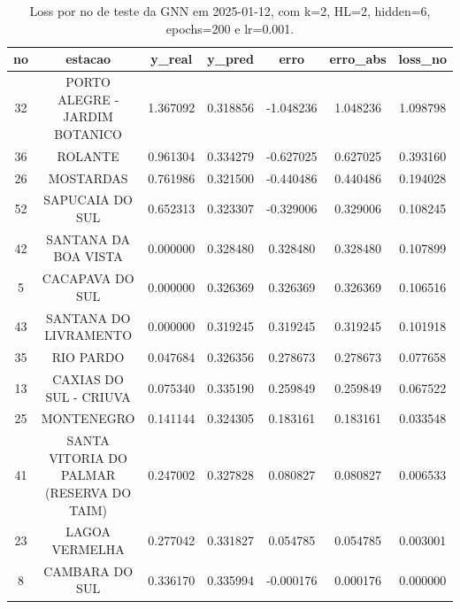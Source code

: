 \begin{table}[h]
\centering
\caption{Loss por no de teste da GNN em 2025-01-12, com k=2, HL=2, hidden=6, epochs=200 e lr=0.001.}
\label{tab:gnn_loss_k2_hl2_h6_e200_d20250112}
\begin{tabular}{ccccccc}
\toprule
no & estacao & y\_real & y\_pred & erro & erro\_abs & loss\_no \\
\midrule
32 & PORTO ALEGRE - JARDIM BOTANICO & 1.367092 & 0.318856 & -1.048236 & 1.048236 & 1.098798 \\
36 & ROLANTE & 0.961304 & 0.334279 & -0.627025 & 0.627025 & 0.393160 \\
26 & MOSTARDAS & 0.761986 & 0.321500 & -0.440486 & 0.440486 & 0.194028 \\
52 & SAPUCAIA DO SUL & 0.652313 & 0.323307 & -0.329006 & 0.329006 & 0.108245 \\
42 & SANTANA DA BOA VISTA & 0.000000 & 0.328480 & 0.328480 & 0.328480 & 0.107899 \\
5 & CACAPAVA DO SUL & 0.000000 & 0.326369 & 0.326369 & 0.326369 & 0.106516 \\
43 & SANTANA DO LIVRAMENTO & 0.000000 & 0.319245 & 0.319245 & 0.319245 & 0.101918 \\
35 & RIO PARDO & 0.047684 & 0.326356 & 0.278673 & 0.278673 & 0.077658 \\
13 & CAXIAS DO SUL - CRIUVA & 0.075340 & 0.335190 & 0.259849 & 0.259849 & 0.067522 \\
25 & MONTENEGRO & 0.141144 & 0.324305 & 0.183161 & 0.183161 & 0.033548 \\
41 & SANTA VITORIA DO PALMAR (RESERVA DO TAIM) & 0.247002 & 0.327828 & 0.080827 & 0.080827 & 0.006533 \\
23 & LAGOA VERMELHA & 0.277042 & 0.331827 & 0.054785 & 0.054785 & 0.003001 \\
8 & CAMBARA DO SUL & 0.336170 & 0.335994 & -0.000176 & 0.000176 & 0.000000 \\
\bottomrule
\end{tabular}
\end{table}
